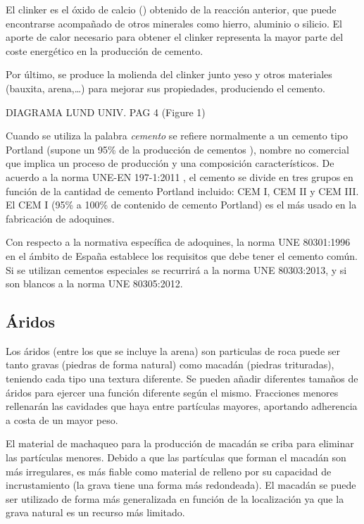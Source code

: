 El clinker es el óxido de calcio () obtenido de la reacción anterior, que puede encontrarse acompañado de otros minerales como hierro, aluminio o silicio. El aporte de calor necesario para obtener el clinker representa la mayor parte del coste energético en la producción de cemento.

Por último, se produce la molienda del clinker junto yeso y otros materiales (bauxita, arena,\ldots) para mejorar sus propiedades, produciendo el cemento.

DIAGRAMA LUND UNIV. PAG 4 (Figure 1)

Cuando se utiliza la palabra \emph{cemento} se refiere normalmente a un cemento tipo Portland (supone un 95\% de la producción de cementos \cite{jsjunnesson}), nombre no comercial que implica un proceso de producción y una composición característicos. De acuerdo a la norma UNE-EN 197-1:2011 \cite{une1971}, el cemento se divide en tres grupos en función de la cantidad de cemento Portland incluido: CEM I, CEM II y CEM III. El CEM I (95\% a 100\% de contenido de cemento Portland) es el más usado en la fabricación de adoquines.

Con respecto a la normativa específica de adoquines, la norma UNE 80301:1996 \cite{une80301} en el ámbito de España establece los requisitos que debe tener el cemento común. Si se utilizan cementos especiales se recurrirá a la norma UNE 80303:2013, y si son blancos a la norma UNE 80305:2012.

\subsection{Áridos}
Los áridos (entre los que se incluye la arena) son particulas de roca puede ser tanto gravas (piedras de forma natural) como macadán (piedras trituradas), teniendo cada tipo una textura diferente. Se pueden añadir diferentes tamaños de áridos para ejercer una función diferente según el mismo. Fracciones menores rellenarán las cavidades que haya entre partículas mayores, aportando adherencia a costa de un mayor peso.

El material de machaqueo para la producción de macadán se criba para eliminar las partículas menores. Debido a que las partículas que forman el macadán son más irregulares, es más fiable como material de relleno por su capacidad de incrustamiento (la grava tiene una forma más redondeada). El macadán se puede ser utilizado de forma más generalizada en función de la localización ya que la grava natural es un recurso más limitado.

